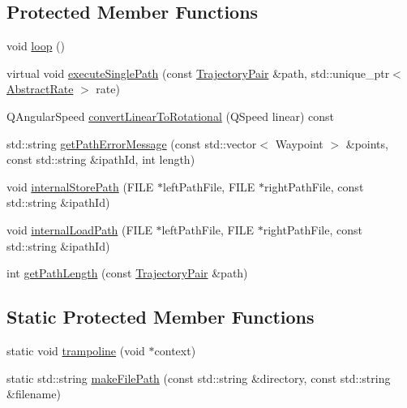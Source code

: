\subsection*{Protected Member Functions}
\begin{DoxyCompactItemize}
\item 
void \mbox{\hyperlink{classokapi_1_1AsyncMotionProfileController_a8a41524c4cc3352e2eda15dfe3e7ad27}{loop}} ()
\item 
virtual void \mbox{\hyperlink{classokapi_1_1AsyncMotionProfileController_abbc724e5856bff8879cb834bfc3cc6c3}{execute\+Single\+Path}} (const \mbox{\hyperlink{structokapi_1_1AsyncMotionProfileController_1_1TrajectoryPair}{Trajectory\+Pair}} \&path, std\+::unique\+\_\+ptr$<$ \mbox{\hyperlink{classokapi_1_1AbstractRate}{Abstract\+Rate}} $>$ rate)
\item 
Q\+Angular\+Speed \mbox{\hyperlink{classokapi_1_1AsyncMotionProfileController_a74b2981453d36e01c30b66c522bdcb52}{convert\+Linear\+To\+Rotational}} (Q\+Speed linear) const
\item 
std\+::string \mbox{\hyperlink{classokapi_1_1AsyncMotionProfileController_add71d15d34ef8c10205c3b6791e32f71}{get\+Path\+Error\+Message}} (const std\+::vector$<$ Waypoint $>$ \&points, const std\+::string \&ipath\+Id, int length)
\item 
void \mbox{\hyperlink{classokapi_1_1AsyncMotionProfileController_ae9f67978e53a0bab9c96ef774505bd58}{internal\+Store\+Path}} (F\+I\+LE $\ast$left\+Path\+File, F\+I\+LE $\ast$right\+Path\+File, const std\+::string \&ipath\+Id)
\item 
void \mbox{\hyperlink{classokapi_1_1AsyncMotionProfileController_adc93d9516b749dee19f0af735d4b83cb}{internal\+Load\+Path}} (F\+I\+LE $\ast$left\+Path\+File, F\+I\+LE $\ast$right\+Path\+File, const std\+::string \&ipath\+Id)
\item 
int \mbox{\hyperlink{classokapi_1_1AsyncMotionProfileController_af14f6b6c201a7b80c32f5fc14c11022f}{get\+Path\+Length}} (const \mbox{\hyperlink{structokapi_1_1AsyncMotionProfileController_1_1TrajectoryPair}{Trajectory\+Pair}} \&path)
\end{DoxyCompactItemize}
\subsection*{Static Protected Member Functions}
\begin{DoxyCompactItemize}
\item 
static void \mbox{\hyperlink{classokapi_1_1AsyncMotionProfileController_a969ac205f73c668edba002011c410efe}{trampoline}} (void $\ast$context)
\item 
static std\+::string \mbox{\hyperlink{classokapi_1_1AsyncMotionProfileController_a3380054b3feb2679fe5b919095959826}{make\+File\+Path}} (const std\+::string \&directory, const std\+::string \&filename)
\end{DoxyCompactItemize}
